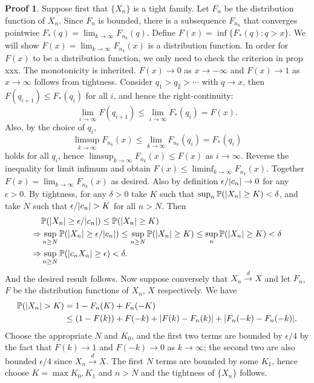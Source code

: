 \documentclass[hidelinks,11pt]{article}
\theoremstyle{definition}
\theoremstyle{dotless}
\newtheorem{prop}{Proof}[section]
\theoremstyle{remark}
\DeclareMathOperator{\1}{\mathbf{1}}
\begin{document}
\begin{prop}
Suppose first that $\{X_n\}$ is a tight family. Let $F_n$ be the distribution function of $X_n$. Since $F_n$ is bounded, there is a subsequence $F_{n_k}$ that converges pointwise $F_\ast(q)=\lim_{k\to\infty}F_{n_k}(q)$. Define $F(x)=\inf\{F_\ast(q):q>x\}$. We will show $F(x)=\lim_{k\to\infty}F_{n_k}(x)$ is a distribution function.\medbreak
In order for $F(x)$ to be a distribution function, we only need to check the criterion in prop xxx. The monotonicity is inherited. $F(x)\to0$ as $x\to-\infty$ and $F(x)\to1$ as $x\to\infty$ follows from tightness. Consider $q_1>q_2>\cdots$ with $q\to x$, then $F(q_{i+1})\leq F_\ast(q_i)$ for all $i$, and hence the right-continuity:
\[\lim_{i\to\infty}F(q_{i+1})\leq\lim_{i\to\infty}F_\ast(q_i)=F(x).\]
Also, by the choice of $q_i$,
\[\limsup_{k\to\infty}F_{n_k}(x)\leq\lim_{k\to\infty}F_{n_k}(q_i)=F_\ast(q_i)\]
holds for all $q_i$, hence $\limsup_{k\to\infty}F_{n_k}(x)\leq F(x)$ as $i\to\infty$. Reverse the inequality for limit infimum and obtain $F(x)\leq\liminf_{k\to\infty}F_{n_k}(x)$. Together $F(x)=\lim_{k\to\infty}F_{n_k}(x)$ as desired.\medbreak
Also by definition $\epsilon/\abs{c_n}\to0$ for any $\epsilon>0$. By tightness, for any $\delta>0$ take $K$ such that $\sup_n\mathbb{P}(\abs{X_n}\geq K)<\delta$, and take $N$ such that $\epsilon/\abs{c_n}>K$ for all $n>N$. Then
\begin{align*}
    &\mathbb{P}(\abs{X_n}\geq\epsilon/\abs{c_n})\leq\mathbb{P}(\abs{X_n}\geq K)\\
    \Rightarrow&\sup_{n\geq N}\mathbb{P}(\abs{X_n}\geq\epsilon/\abs{c_n})\leq\sup_{n\geq N}\mathbb{P}(\abs{X_n}\geq K)\leq\sup_n\mathbb{P}(\abs{X_n}\geq K)<\delta\\
    \Rightarrow&\sup_{n\geq N}\mathbb{P}(\abs{c_nX_n}\geq\epsilon)<\delta.
\end{align*}
And the desired result follows.\medbreak
Now suppose conversely that $X_n\xrightarrow{d}X$ and let $F_n$, $F$ be the distribution functions of $X_n$, $X$ respectively. We have
\begin{align*}
\mathbb{P}(\abs{X_n}>K)&=1-F_n(K)+F_n(-K)\\
&\leq(1-F(k))+F(-k)+\abs{F(k)-F_n(k)}+\abs{F_n(-k)-F_n(-k)}.
\end{align*}
Choose the appropriate $N$ and $K_0$, and the first two terms are bounded by $\epsilon/4$ by the fact that $F(k)\to1$ and $F(-k)\to0$ as $k\to\infty$; the second two are also bounded $\epsilon/4$ since $X_n\xrightarrow{d}X$. The first $N$ terms are bounded by some $K_1$, hence choose $K=\max{K_0,K_1}$ and $n>N$ and the tightness of $\{X_n\}$ follows.
\end{prop}
\end{document}
